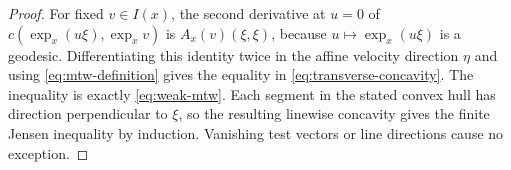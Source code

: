 \begin{proof}
For fixed $v\in I(x)$, the second derivative at $u=0$ of
$c(\exp_x(u\xi),\exp_x v)$ is $A_x(v)(\xi,\xi)$, because
$u\mapsto\exp_x(u\xi)$ is a geodesic.  Differentiating this identity
twice in the affine velocity direction $\eta$ and using
\eqref{eq:mtw-definition} gives the equality in
\eqref{eq:transverse-concavity}.  The inequality is exactly
\eqref{eq:weak-mtw}.  Each segment in the stated convex hull has
direction perpendicular to $\xi$, so the resulting linewise concavity
gives the finite Jensen inequality by induction.  Vanishing test
vectors or line directions cause no exception.
\end{proof}
